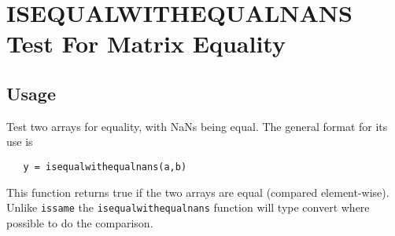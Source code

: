 \section{ISEQUALWITHEQUALNANS Test For Matrix Equality}

\subsection{Usage}

Test two arrays for equality, with NaNs being equal.  The general format
for its use is
\begin{verbatim}
   y = isequalwithequalnans(a,b)
\end{verbatim}
This function returns true if the two arrays are
equal (compared element-wise).  Unlike \verb|issame|
the \verb|isequalwithequalnans| function will type convert where
possible to do the comparison.

